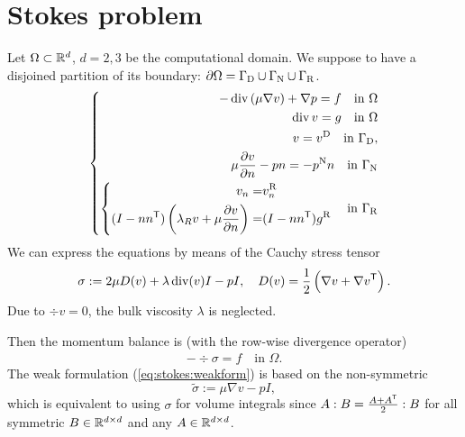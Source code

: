 %
\section{Stokes problem}\label{sec:}
%
Let $\Omega\subset \mathbb R^d$, $d=2,3$ be the computational domain. We suppose to have a disjoined partition of its boundary:
$\partial\Omega=\Gamma_{\rm D}\cup\Gamma_{\rm N}\cup\Gamma_{\rm R}$.
%
\begin{equation}\label{eq:stokes:strongform}
%
\left\{
\begin{aligned}
-\div\left(\mu\nabla v\right) + \nabla p = f \quad \mbox{in $\Omega$}\\
\div v  = g \quad \mbox{in $\Omega$}\\
v = \vD \quad \mbox{in $\GammaD$},\\
\mu\frac{\partial v}{\partial n} - p n = -\pN n\quad \mbox{in $\GammaN$}\\
%
\left\{
\begin{aligned}
v_n =& \vn\\
(I-n\transpose{n}) \left( \lambda_R v + \mu \frac{\partial v}{\partial n}\right)  =& (I-n\transpose{n})\gR 
\end{aligned}
\right.
%
\quad \mbox{in $\GammaR$}
\end{aligned}
\right.
%
\end{equation}
%
We can express the equations by means of the Cauchy stress tensor
%
\begin{equation}\label{eq:Stokes:CauchyStress}
\sigma := 2\mu D(v) + \lambda\operatorname{div}(v) I - p I,\quad  D(v)  = \frac12 \left(\nabla v + {\nabla v}^{\mathsf{T}}\right).
\end{equation}
%
Due to $\div v=0$, the bulk viscosity $\lambda$ is neglected.

Then the momentum balance is (with the row-wise divergence operator)
%
\begin{align*}
-\div \sigma = f \quad \mbox{in $\Omega$}.
\end{align*}
%
The weak formulation (\ref{eq:stokes:weakform}) is based on the non-symmetric
%
\begin{equation}\label{eq:Stokes:CauchyStressnonsymmetric}
\widetilde{\sigma} := \mu \nabla v - p I,
\end{equation}
%
which is equivalent to using $\sigma$ for volume integrals since $A:B=\frac{A+{A}^{\mathsf{T}}}{2}:B$ for all symmetric $B\in\mathbb R^{d\times d}$ and any $A\in\mathbb R^{d\times d}$.

